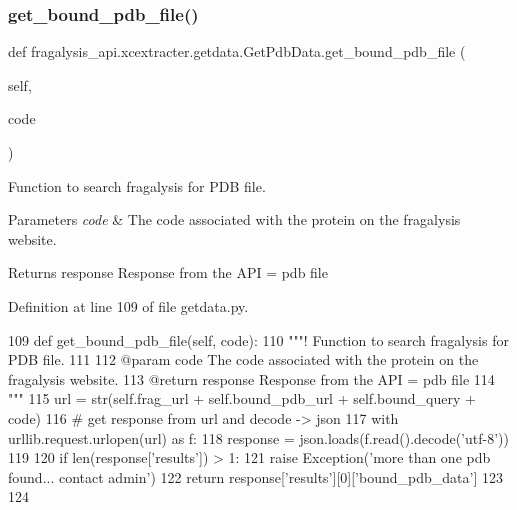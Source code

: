 \subsubsection{\texorpdfstring{get\+\_\+bound\+\_\+pdb\+\_\+file()}{get\_bound\_pdb\_file()}}
{\footnotesize\ttfamily def fragalysis\+\_\+api.\+xcextracter.\+getdata.\+Get\+Pdb\+Data.\+get\+\_\+bound\+\_\+pdb\+\_\+file (\begin{DoxyParamCaption}\item[{}]{self,  }\item[{}]{code }\end{DoxyParamCaption})}



Function to search fragalysis for P\+DB file. 


\begin{DoxyParams}{Parameters}
{\em code} & The code associated with the protein on the fragalysis website. \\
\hline
\end{DoxyParams}
\begin{DoxyReturn}{Returns}
response Response from the A\+PI = pdb file 
\end{DoxyReturn}


Definition at line 109 of file getdata.\+py.


\begin{DoxyCode}
109     \textcolor{keyword}{def }get\_bound\_pdb\_file(self, code):
110         \textcolor{stringliteral}{"""! Function to search fragalysis for PDB file.}
111 \textcolor{stringliteral}{}
112 \textcolor{stringliteral}{        @param code The code associated with the protein on the fragalysis website.}
113 \textcolor{stringliteral}{        @return response Response from the API = pdb file}
114 \textcolor{stringliteral}{        """}
115         url = str(self.frag\_url + self.bound\_pdb\_url + self.bound\_query + code)
116         \textcolor{comment}{# get response from url and decode -> json}
117         with urllib.request.urlopen(url) \textcolor{keyword}{as} f:
118             response = json.loads(f.read().decode(\textcolor{stringliteral}{'utf-8'}))
119 
120         \textcolor{keywordflow}{if} len(response[\textcolor{stringliteral}{'results'}]) > 1:
121             \textcolor{keywordflow}{raise} Exception(\textcolor{stringliteral}{'more than one pdb found... contact admin'})
122         \textcolor{keywordflow}{return} response[\textcolor{stringliteral}{'results'}][0][\textcolor{stringliteral}{'bound\_pdb\_data'}]
123 
124 
\end{DoxyCode}


